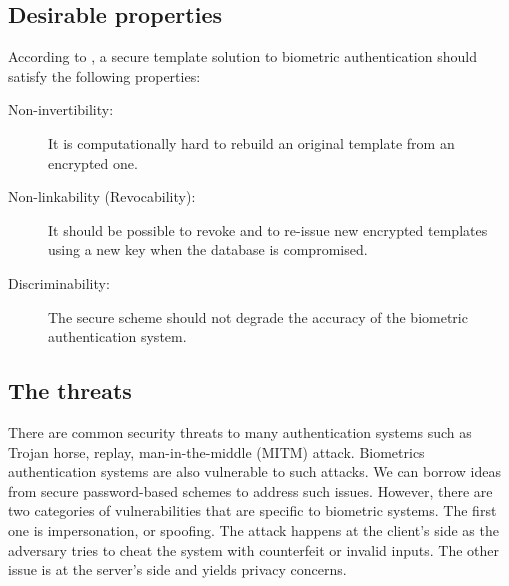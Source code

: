 \subsection{Desirable properties}
\label{sec:privacyProps}
According to \cite{jain201650}, a secure template solution to biometric
authentication should satisfy the following properties:
\begin{description}
\item[Non-invertibility:] It is computationally hard to rebuild an original
  template from an encrypted one.
\item[Non-linkability (Revocability):] It should be possible to revoke and to
  re-issue new encrypted templates using a new key when the database is
  compromised.
\item[Discriminability:] The secure scheme should not degrade the accuracy of
  the biometric authentication system.
\end{description}
\subsection{The threats}
\label{sec:privacyReqs}
There are common security threats to many authentication systems such as Trojan
horse, replay, man-in-the-middle (MITM) attack. Biometrics authentication
systems are also vulnerable to such attacks. We can borrow ideas from secure
password-based schemes to address such issues. However, there are two categories
of vulnerabilities that are specific to biometric systems.  The first one is
impersonation, or spoofing. The attack happens at the client's side as the
adversary tries to cheat the system with counterfeit or invalid inputs.  The
other issue is at the server's side and yields privacy concerns.

